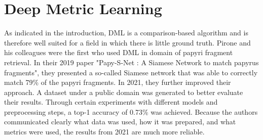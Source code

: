 \section{Deep Metric Learning}
As indicated in the introduction, DML is a comparison-based algorithm and is therefore well suited for a field in which there is little ground truth. Pirone and his colleagues were the first who used DML in domain of papyri fragment retrieval. In their 2019 paper "Papy-S-Net : A Siamese Network to match papyrus fragments", they presented a so-called Siamese network that was able to correctly match 79\% of the papyri fragments. In 2021, they further improved their approach. A dataset under a public domain was generated to better evaluate their results. Through certain experiments with different models and preprocessing steps, a top-1 accuracy of 0.73\% was achieved. Because the authors communicated clearly what data was used, how it was prepared, and what metrics were used, the results from 2021 are much more reliable.


